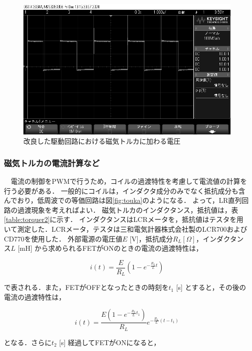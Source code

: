 \begin{figure}[H]
	\centering
		\includegraphics[scale=0.25]{./figure/scope_11.png}
		\caption{改良した駆動回路における磁気トルカに加わる電圧}
		\label{fig:osiro2}
\end{figure}

\subsubsection{磁気トルカの電流計算など}

　電流の制御をPWMで行うため，コイルの過渡特性を考慮して電流値の計算を行う必要がある．
一般的にコイルは，インダクタ成分のみでなく抵抗成分も含んでおり，低周波での等価回路は図\ref{fig:touka}のようになる．
よって，LR直列回路の過渡現象を考えればよい．
磁気トルカのインダクタンス，抵抗値は，表\ref{table:torquer2}に示す．
インダクタンスはLCRメータを，抵抗値はテスタを用いて測定した．LCRメータ，テスタは三和電気計器株式会社製のLCR700およびCD770を使用した．
外部電源の電圧値$E$ [V]，抵抗成分$R_L [\Omega]$，インダクタンス$L$ [mH] から求められるFETがONのときの電流の過渡特性は，


\begin{equation}
	i(t) = \frac{E}{R_L}\left(1-e^{-\frac{R_L}{L}t}\right)
\end{equation}

で表される．また，FETがOFFとなったときの時刻を$t_1$ [s] とすると，その後の電流の過渡特性は，

\begin{equation}
	i(t) = \frac{E\left(1-e^{-\frac{R_L}{L}t_1}\right)}{R_L}e^{-\frac{R_L}{L}(t-t_1)}
\end{equation}

となる．さらに$t_2$ [s] 経過してFETがONになると，

